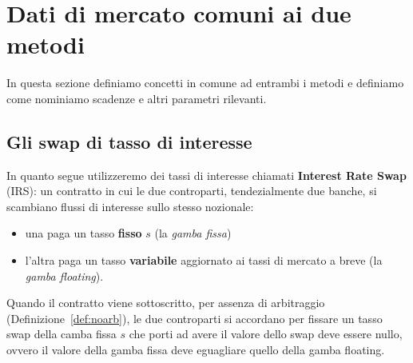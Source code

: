 \documentclass[11pt,a4paper]{article}
\theoremstyle{plain}
\theoremstyle{definition}
\theoremstyle{remark}
\begin{document}
\section{Dati di mercato comuni ai due metodi}
\label{sec:dati-mercato}
In questa sezione definiamo concetti in comune ad entrambi i metodi e definiamo come nominiamo scadenze e altri parametri rilevanti.


\subsection{Gli swap di tasso di interesse}
\label{sec:swap}
In quanto segue utilizzeremo dei tassi di interesse chiamati \textbf{Interest Rate Swap} (IRS): 
un contratto in cui le due controparti, tendezialmente due banche, si scambiano
flussi di interesse sullo stesso nozionale: 
\begin{itemize}
  \item una paga un tasso \textbf{fisso} $s$ (la
\emph{gamba fissa})
\item l'altra paga un tasso \textbf{variabile} aggiornato ai tassi di
mercato a breve (la \emph{gamba floating}). 
\end{itemize}

Quando il contratto viene sottoscritto, per assenza di arbitraggio (Definizione~\ref{def:noarb}), le due controparti si accordano
per fissare un tasso swap della camba fissa $s$ che porti ad avere il valore dello swap
deve essere nullo, ovvero il valore della gamba fissa deve eguagliare quello della gamba floating.
\end{document}
